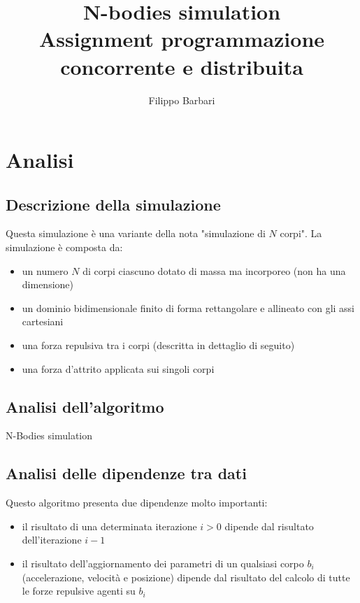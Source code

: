 \documentclass[12pt,a4paper,oneside]{article}
\begin{document}
	
	\title{N-bodies simulation\\Assignment programmazione concorrente e distribuita}
	\author{Filippo Barbari}
	\date{}%
	\maketitle
	
	\tableofcontents
	\newpage
	
	\section{Analisi}
	\subsection{Descrizione della simulazione}
	Questa simulazione è una variante della nota "simulazione di $N$ corpi". La simulazione è composta da:
	\begin{itemize}
		\item un numero $N$ di corpi ciascuno dotato di massa ma incorporeo (non ha una dimensione)
		\item un dominio bidimensionale finito di forma rettangolare e allineato con gli assi cartesiani
		\item una forza repulsiva tra i corpi (descritta in dettaglio di seguito)
		\item una forza d'attrito applicata sui singoli corpi
	\end{itemize}
	
	\subsection{Analisi dell'algoritmo}
	\begin{algorithm}
		
		\caption{N-Bodies simulation}
	\end{algorithm}
	
	\subsection{Analisi delle dipendenze tra dati}
	Questo algoritmo presenta due dipendenze molto importanti:
	\begin{itemize}
		\item il risultato di una determinata iterazione $i > 0$ dipende dal risultato dell'iterazione $i-1$
		\item il risultato dell'aggiornamento dei parametri di un qualsiasi corpo $b_i$ (accelerazione, velocità e posizione) dipende dal risultato del calcolo di tutte le forze repulsive agenti su $b_i$
	\end{itemize}
	
\end{document}
